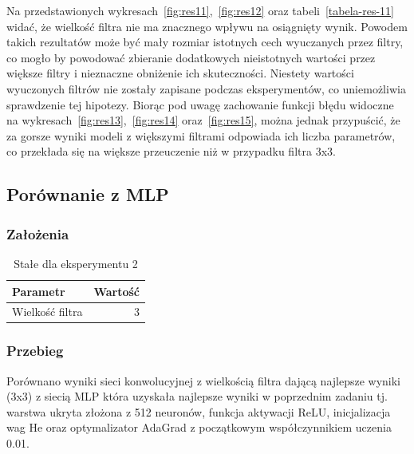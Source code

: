 \documentclass{article}
\begin{document}
Na przedstawionych wykresach~\ref{fig:res11},~\ref{fig:res12} oraz tabeli~\ref{tabela-res-11} widać, że wielkość filtra nie ma znacznego wpływu na osiągnięty wynik. Powodem takich rezultatów może być mały rozmiar istotnych cech wyuczanych przez filtry, co mogło by powodować zbieranie dodatkowych nieistotnych wartości przez większe filtry i nieznaczne obniżenie ich skuteczności. Niestety wartości wyuczonych filtrów nie zostały zapisane podczas eksperymentów, co uniemożliwia sprawdzenie tej hipotezy. Biorąc pod uwagę zachowanie funkcji błędu widoczne na wykresach~\ref{fig:res13},~\ref{fig:res14} oraz~\ref{fig:res15}, można jednak przypuścić, że za gorsze wyniki modeli z większymi filtrami odpowiada ich liczba parametrów, co przekłada się na większe przeuczenie niż w przypadku filtra 3x3.

\newpage
\subsection{Porównanie z MLP}
\subsubsection*{Założenia}
\begin{table}[H]
	\caption{Stałe dla eksperymentu 2}
	\label{tabela-const-2}
	\centering
	\begin{tabular}{lr}
		\toprule
		Parametr          & Wartość \\
		\midrule
		Wielkość filtra & 3         \\
		\bottomrule
	\end{tabular}
\end{table}

\subsubsection*{Przebieg}

Porównano wyniki sieci konwolucyjnej z wielkością filtra dającą najlepsze wyniki (3x3) z siecią MLP która uzyskała najlepsze wyniki w poprzednim zadaniu tj. warstwa ukryta złożona z 512 neuronów, funkcja aktywacji ReLU, inicjalizacja wag He oraz optymalizator AdaGrad z początkowym współczynnikiem uczenia 0.01.
\end{document}
